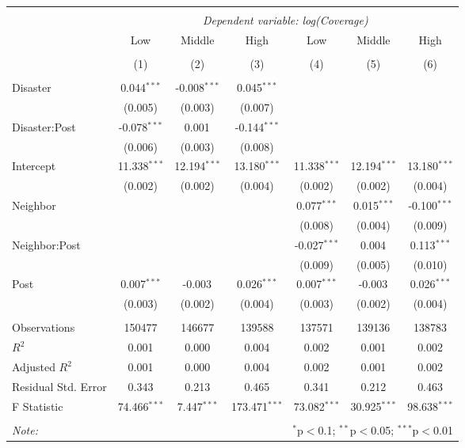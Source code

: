 
\begin{tabular}{@{\extracolsep{5pt}}lcccccc}
\\[-1.8ex]\hline
\hline \\[-1.8ex]
& \multicolumn{6}{c}{\textit{Dependent variable: log(Coverage)}} \
\cr \cline{2-7}
\\[-1.8ex] & \multicolumn{1}{c}{Low} & \multicolumn{1}{c}{Middle} & \multicolumn{1}{c}{High} & \multicolumn{1}{c}{Low} & \multicolumn{1}{c}{Middle} & \multicolumn{1}{c}{High}  \\
\\[-1.8ex] & (1) & (2) & (3) & (4) & (5) & (6) \\
\hline \\[-1.8ex]
 Disaster & 0.044$^{***}$ & -0.008$^{***}$ & 0.045$^{***}$ & & & \\
& (0.005) & (0.003) & (0.007) & & & \\
 Disaster:Post & -0.078$^{***}$ & 0.001$^{}$ & -0.144$^{***}$ & & & \\
& (0.006) & (0.003) & (0.008) & & & \\
 Intercept & 11.338$^{***}$ & 12.194$^{***}$ & 13.180$^{***}$ & 11.338$^{***}$ & 12.194$^{***}$ & 13.180$^{***}$ \\
& (0.002) & (0.002) & (0.004) & (0.002) & (0.002) & (0.004) \\
 Neighbor & & & & 0.077$^{***}$ & 0.015$^{***}$ & -0.100$^{***}$ \\
& & & & (0.008) & (0.004) & (0.009) \\
 Neighbor:Post & & & & -0.027$^{***}$ & 0.004$^{}$ & 0.113$^{***}$ \\
& & & & (0.009) & (0.005) & (0.010) \\
 Post & 0.007$^{***}$ & -0.003$^{}$ & 0.026$^{***}$ & 0.007$^{***}$ & -0.003$^{}$ & 0.026$^{***}$ \\
& (0.003) & (0.002) & (0.004) & (0.003) & (0.002) & (0.004) \\
\hline \\[-1.8ex]
 Observations & 150477 & 146677 & 139588 & 137571 & 139136 & 138783 \\
 $R^2$ & 0.001 & 0.000 & 0.004 & 0.002 & 0.001 & 0.002 \\
 Adjusted $R^2$ & 0.001 & 0.000 & 0.004 & 0.002 & 0.001 & 0.002 \\
 Residual Std. Error & 0.343  & 0.213  & 0.465  & 0.341  & 0.212  & 0.463  \\
 F Statistic & 74.466$^{***}$  & 7.447$^{***}$  & 173.471$^{***}$  & 73.082$^{***}$  & 30.925$^{***}$  & 98.638$^{***}$  \\
\hline
\hline \\[-1.8ex]
\textit{Note:} & \multicolumn{6}{r}{$^{*}$p$<$0.1; $^{**}$p$<$0.05; $^{***}$p$<$0.01} \\
\end{tabular}
